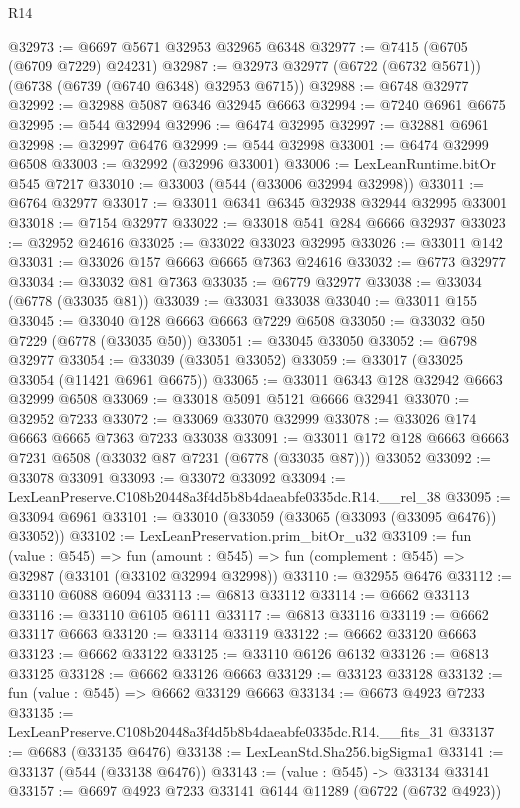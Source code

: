 \begin{lexlean}{R14}
\begin{coremodule}
@32973 := @6697 @5671 @32953 @32965 @6348
@32977 := @7415 (@6705 (@6709 @7229) @24231)
@32987 := @32973 @32977 (@6722 (@6732 @5671)) (@6738 (@6739 (@6740 @6348) @32953 @6715))
@32988 := @6748 @32977
@32992 := @32988 @5087 @6346 @32945 @6663
@32994 := @7240 @6961 @6675
@32995 := @544 @32994
@32996 := @6474 @32995
@32997 := @32881 @6961
@32998 := @32997 @6476
@32999 := @544 @32998
@33001 := @6474 @32999 @6508
@33003 := @32992 (@32996 @33001)
@33006 := LexLeanRuntime.bitOr @545 @7217
@33010 := @33003 (@544 (@33006 @32994 @32998))
@33011 := @6764 @32977
@33017 := @33011 @6341 @6345 @32938 @32944 @32995 @33001
@33018 := @7154 @32977
@33022 := @33018 @541 @284 @6666 @32937
@33023 := @32952 @24616
@33025 := @33022 @33023 @32995
@33026 := @33011 @142
@33031 := @33026 @157 @6663 @6665 @7363 @24616
@33032 := @6773 @32977
@33034 := @33032 @81 @7363
@33035 := @6779 @32977
@33038 := @33034 (@6778 (@33035 @81))
@33039 := @33031 @33038
@33040 := @33011 @155
@33045 := @33040 @128 @6663 @6663 @7229 @6508
@33050 := @33032 @50 @7229 (@6778 (@33035 @50))
@33051 := @33045 @33050
@33052 := @6798 @32977
@33054 := @33039 (@33051 @33052)
@33059 := @33017 (@33025 @33054 (@11421 @6961 @6675))
@33065 := @33011 @6343 @128 @32942 @6663 @32999 @6508
@33069 := @33018 @5091 @5121 @6666 @32941
@33070 := @32952 @7233
@33072 := @33069 @33070 @32999
@33078 := @33026 @174 @6663 @6665 @7363 @7233 @33038
@33091 := @33011 @172 @128 @6663 @6663 @7231 @6508 (@33032 @87 @7231 (@6778 (@33035 @87))) @33052
@33092 := @33078 @33091
@33093 := @33072 @33092
@33094 := LexLeanPreserve.C108b20448a3f4d5b8b4daeabfe0335dc.R14.__rel_38
@33095 := @33094 @6961
@33101 := @33010 (@33059 (@33065 (@33093 (@33095 @6476)) @33052))
@33102 := LexLeanPreservation.prim_bitOr_u32
@33109 := fun (value : @545) =>
  fun (amount : @545) => fun (complement : @545) => @32987 (@33101 (@33102 @32994 @32998))
@33110 := @32955 @6476
@33112 := @33110 @6088 @6094
@33113 := @6813 @33112
@33114 := @6662 @33113
@33116 := @33110 @6105 @6111
@33117 := @6813 @33116
@33119 := @6662 @33117 @6663
@33120 := @33114 @33119
@33122 := @6662 @33120 @6663
@33123 := @6662 @33122
@33125 := @33110 @6126 @6132
@33126 := @6813 @33125
@33128 := @6662 @33126 @6663
@33129 := @33123 @33128
@33132 := fun (value : @545) => @6662 @33129 @6663
@33134 := @6673 @4923 @7233
@33135 := LexLeanPreserve.C108b20448a3f4d5b8b4daeabfe0335dc.R14.__fits_31
@33137 := @6683 (@33135 @6476)
@33138 := LexLeanStd.Sha256.bigSigma1
@33141 := @33137 (@544 (@33138 @6476))
@33143 := (value : @545) -> @33134 @33141
@33157 := @6697
    @4923
    @7233
    @33141
    @6144
    @11289
    (@6722 (@6732 @4923))

\end{coremodule}
\end{lexlean}
